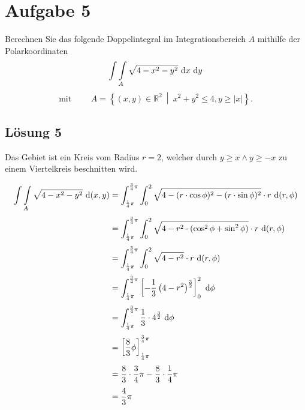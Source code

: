 \documentclass[main.tex]{subfiles}
\begin{document}
\section{Aufgabe 5}
Berechnen Sie das folgende Doppelintegral im Integrationsbereich $A$ mithilfe der Polarkoordinaten
\[
    \int \int \limits_{A} \sqrt{4 - x^2 - y^2} ~\mathrm{d}x ~\mathrm{d}y
\]
\[
\mbox{mit } \qquad
    A = \left\{ (x,y) \in \mathbb{R}^2 \ \middle| \ x^2 + y^2 \leq 4, y \geq |x| \right\}.
\]

\subsection{Lösung 5}
Das Gebiet ist ein Kreis vom Radius $r=2$, welcher durch $y\geq x \land y \geq -x$ zu einem Viertelkreis beschnitten wird.

\begin{align*}
    \int \int \limits_{A} \sqrt{4 - x^2 - y^2} ~\mathrm{d}(x,y)
    &=
    \int_{\frac{1}{4}\pi}^{\frac{3}{4}\pi}
    \int_{0}^{2}
        \sqrt{4 - (r\cdot \cos \phi)^2 - (r\cdot \sin \phi)^2}
        \cdot r
    ~\mathrm{d}(r,\phi) \\[1mm]
    &=
    \int_{\frac{1}{4}\pi}^{\frac{3}{4}\pi}
    \int_{0}^{2}
        \sqrt{4 - r^2\cdot (\cos^2 \phi + \sin^2 \phi)}
        \cdot r
    ~\mathrm{d}(r,\phi) \\[1mm]
    &=
    \int_{\frac{1}{4}\pi}^{\frac{3}{4}\pi}
    \int_{0}^{2}
        \sqrt{4 - r^2}
        \cdot r
    ~\mathrm{d}(r,\phi) \\[1mm]
    &=
    \int_{\frac{1}{4}\pi}^{\frac{3}{4}\pi}
    \left[
        - \frac{1}{3} \left( 4 - r^2 \right)^{\frac{3}{2}}
    \right]_{0}^{2}
    ~\mathrm{d}\phi \\[1mm]
    &=
    \int_{\frac{1}{4}\pi}^{\frac{3}{4}\pi}
        \frac{1}{3} \cdot 4^{\frac{3}{2}}
    ~\mathrm{d}\phi \\[1mm]
    &=
    \left[
        \frac{8}{3}\phi
    \right]_{\frac{1}{4}\pi}^{\frac{3}{4}\pi} \\[1mm]
    &= \frac{8}{3} \cdot \frac{3}{4}\pi - \frac{8}{3}\cdot \frac{1}{4}\pi \\[1mm]
    &= \frac{4}{3} \pi
\end{align*}
\end{document}
